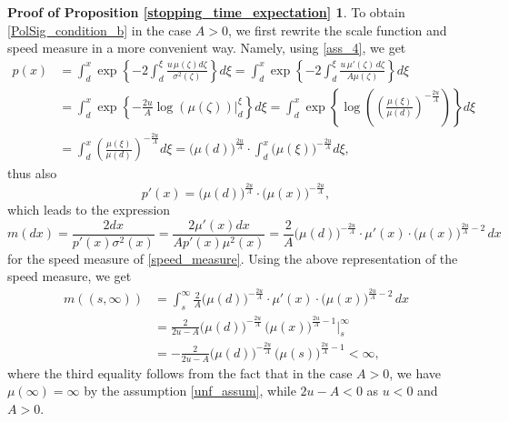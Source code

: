\documentclass[11pt,tbtags,reqno]{article}
\theoremstyle{definition}
\numberwithin{equation}{section}
\theoremstyle{definition}
\newtheorem*{proof_prop_2}{Proof of Proposition \ref{stopping_time_expectation}}
\begin{document}
\begin{appendices}
\begin{proof_prop_2}
To obtain \eqref{PolSig_condition_b} in the case $A > 0$, we first rewrite the scale function and speed measure in a more convenient way. Namely, using \ref{ass_4}, we get
\begin{equation}
    \begin{split}
        p(x) &=
        \int_{d}^{x} \exp \left\{-2 \int_{d}^{\xi} \frac{u \, \mu(\zeta) d \zeta}{\sigma^{2}(\zeta)}\right\} d \xi
        =
        \int_{d}^{x} \exp \left\{-2 \int_{d}^{\xi} \frac{u\, \mu'(\zeta) \, d \zeta}{A\mu(\zeta)}\right\} d \xi
        \\ &=
        \int_{d}^{x} \exp \left\{-\frac{2u}{A} \log(\mu(\zeta) )\Big|_{d}^{\xi}\right\} d \xi
        =
        \int_{d}^{x} \exp \left\{ 
        \log\left(\left(\frac{\mu(\xi)}{\mu(d)} \right)^{-\frac{2u}{A}}\right)
        \right\} d \xi
        \\ &=
        \int_{d}^{x} \left(\frac{\mu(\xi)}{\mu(d)} \right)^{-\frac{2u}{A}} d \xi
        =
        \big(\mu(d)\big)^{\frac{2u}{A}} \cdot \int_{d}^{x} \big(\mu(\xi)\big)^{-\frac{2u}{A}} d \xi,
    \end{split}
\end{equation}
thus also
\begin{equation}
    p'(x) = \big(\mu(d)\big)^{\frac{2u}{A}} \cdot \big(\mu(x)\big)^{-\frac{2u}{A}},
\end{equation}
which leads to the expression 
\begin{equation}\label{scale_measure_special_form}
        m(dx) = 
        \frac{2dx}{p'(x)\sigma^2(x)}
        =
        \frac{2 \mu'(x) dx}{A p'(x)\mu^2(x)}
        =
        \frac{2}{A}\big(\mu(d)\big)^{-\frac{2u}{A}} \cdot \mu'(x) \cdot \big(\mu(x)\big) ^{\frac{2u}{A} - 2} \, dx
\end{equation}
for the speed measure of \eqref{speed_measure}.
Using the above representation of the speed measure, we get
\begin{equation}\label{full_measure_nonzero_case}
    \begin{split}
        m((s, \infty)) &= \int_s^\infty \frac{2}{A}\big(\mu(d)\big)^{-\frac{2u}{A}} \cdot \mu'(x) \cdot \big(\mu(x)\big) ^{\frac{2u}{A} - 2} \, dx
        \\ &=
        \frac{2}{2u - A} \big(\mu(d)\big)^{-\frac{2u}{A}} \, \big(\mu(x)\big) ^{\frac{2u}{A} - 1} \bigg|_s^\infty 
        \\&=
        -\frac{2}{2u - A} \big(\mu(d)\big)^{-\frac{2u}{A}} \, \big(\mu(s)\big) ^{\frac{2u}{A} - 1} < \infty,
    \end{split}
\end{equation}
where the third equality follows from the fact that in the case $A > 0$, we have $\mu(\infty) = \infty$ by the assumption \ref{unf_assum}, while $2u - A < 0$ as $u < 0$ and $A > 0$.


\end{proof_prop_2}
\end{appendices}
\end{document}
